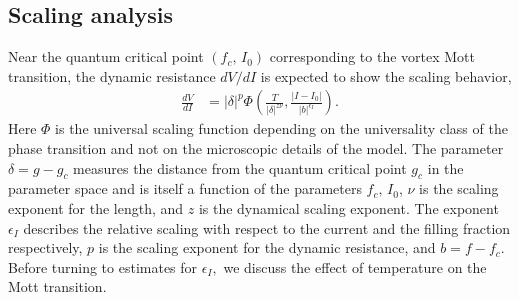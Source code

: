 \documentclass[aps,twocolumn,prl,10pt,amsmath,amssymb,nofootinbib,showpacs,superscriptaddress,floatfix]{revtex4-1}
\begin{document}
\subsection{Scaling analysis}
Near the quantum critical point $(f_{c},\, I_{0})$ corresponding
to the vortex Mott transition, the dynamic resistance $dV/dI$ is
expected to show the scaling behavior, 
\begin{align}
	\frac{dV}{dI} & =|\delta|^{p}\Phi\left(\frac{T}{|\delta|^{z\nu}},\frac{|I-I_{0}|}{|b|^{\epsilon_{I}}}\right).\label{eq:QPT-scaling-SI}
\end{align}
Here $\Phi$ is the universal scaling function depending on the
universality class of the phase transition and not on the microscopic
details of the model. The parameter $\delta=g-g_{c}$ measures the distance from
the quantum critical point $g_{c}$ in the parameter space and is itself a function
of the parameters $f_{c},\, I_{0}$, $\nu$ is the scaling exponent
for the length, and $z$ is the dynamical scaling exponent. The exponent
$\epsilon_I$ describes the relative scaling with respect to the current and the
filling fraction respectively, $p$ is the scaling exponent for the dynamic resistance,
and $b=f-f_{c}$. Before turning to estimates for $\epsilon_I,$ we discuss the 
effect of temperature on the Mott transition.
\end{document}
